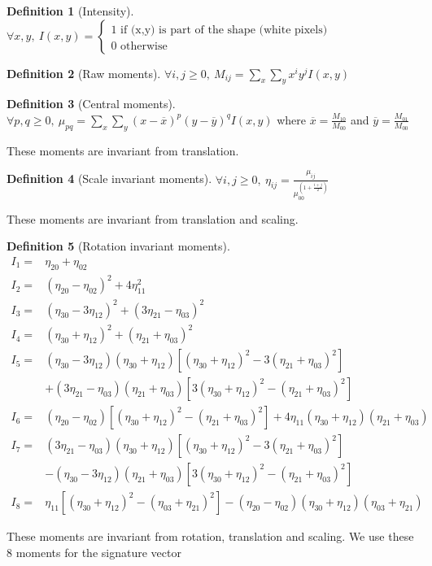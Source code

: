 \documentclass[a4paper,12pt]{article}
\renewcommand{\bar}{\overline}
\theoremstyle{example}
\theoremstyle{remark}
\theoremstyle{definition}
\newtheorem{definition}{Definition}
\begin{document}
\begin{definition}[Intensity]
$ \forall x,y, ~ I(x,y) = \begin{cases}
1 \text{ if (x,y) is part of the shape (white pixels)}\\
0 \text{ otherwise}
\end{cases}$
\end{definition}
\begin{definition}[Raw moments]
$\forall i,j \geq 0, ~ M_{ij} = \sum\limits_x \sum\limits_y x^i y^j I(x,y)$
\end{definition}
\begin{definition}[Central moments]
$\forall p,q \geq 0, ~ \mu_{pq} = \sum\limits_{x} \sum\limits_{y} (x - \bar{x})^p(y - \bar{y})^q I(x,y)$ where $\bar{x} = \frac{M_{10}}{M_{00}}$ and $\bar{y} = \frac{M_{01}}{M_{00}}$

These moments are invariant from translation.
\end{definition}
\begin{definition}[Scale invariant moments]
$\forall i,j \geq 0, ~ \eta_{ij} = \frac{\mu_{ij}}{\mu_{00}^{\left(1 + \frac{i+j}{2}\right)}}$

These moments are invariant from translation and scaling.
\end{definition}
\begin{definition}[Rotation invariant moments]
\begin{align*}
I_1 =& \eta_{20} + \eta_{02} \\
I_2 =& (\eta_{20} - \eta_{02})^2 + 4\eta_{11}^2 \\
I_3 =& (\eta_{30} - 3\eta_{12})^2 + (3\eta_{21} - \eta_{03})^2 \\
I_4 =& (\eta_{30} + \eta_{12})^2 + (\eta_{21} + \eta_{03})^2 \\
I_5 =& (\eta_{30} - 3\eta_{12}) (\eta_{30} + \eta_{12})[ (\eta_{30} + \eta_{12})^2 - 3 (\eta_{21} + \eta_{03})^2] \\
&+ (3 \eta_{21} - \eta_{03}) (\eta_{21} + \eta_{03})[ 3(\eta_{30} + \eta_{12})^2 -  (\eta_{21} + \eta_{03})^2] \\
I_6 =&  (\eta_{20} - \eta_{02})[(\eta_{30} + \eta_{12})^2 - (\eta_{21} + \eta_{03})^2] + 4\eta_{11}(\eta_{30} + \eta_{12})(\eta_{21} + \eta_{03}) \\
I_7 =& (3 \eta_{21} - \eta_{03})(\eta_{30} + \eta_{12})[(\eta_{30} + \eta_{12})^2 - 3(\eta_{21} + \eta_{03})^2] \\
&- (\eta_{30} - 3\eta_{12})(\eta_{21} + \eta_{03})[3(\eta_{30} + \eta_{12})^2 - (\eta_{21} + \eta_{03})^2] \\
I_8 =& \eta_{11}[ ( \eta_{30} + \eta_{12})^2 - (\eta_{03} + \eta_{21})^2  ] - (\eta_{20}-\eta_{02}) (\eta_{30}+\eta_{12}) (\eta_{03}+\eta_{21})
\end{align*}

These moments are invariant from rotation, translation and scaling. We use these 8 moments for the signature vector
\end{definition}
\end{document}
